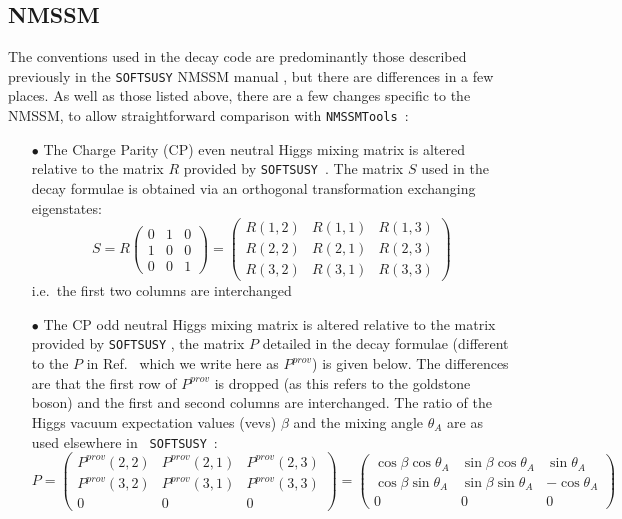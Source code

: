 \documentclass[final,3p,times]{elsarticle}
\begin{document}
\subsection{NMSSM} \label{NMSSMconventions}
The conventions used in the decay code are predominantly those described previously in the {\tt SOFTSUSY} NMSSM manual \cite{Allanach:2013kza}, but there are differences in a few places. As well as those listed above, there are a few changes specific to the NMSSM, to allow straightforward comparison with {\tt NMSSMTools}~\cite{Ellwanger:2004xm,Ellwanger:2006rn,Ellwanger:2012dd,Ellwanger:2006ch}:
\begin{itemize}
	\item[$\bullet$] The Charge Parity (CP) even neutral Higgs mixing matrix is altered relative to the matrix $R$ provided by {\tt SOFTSUSY}~\cite {Allanach:2013kza}. The matrix $S$ used in the decay formulae is obtained via an orthogonal transformation exchanging eigenstates:  
\begin{equation}
S = R \left( \begin{array}{ccc}
	0 & 1 & 0 \\
	1 & 0 & 0 \\
	0 & 0 & 1 \end{array} \right)
  =	\left( \begin{array}{ccc}
	R(1,2) & R(1,1) & R(1,3) \\
	R(2,2) & R(2,1) & R(2,3) \\
	R(3,2) & R(3,1) & R(3,3) \end{array} \right)
\end{equation}
i.e.\ the first two columns are interchanged 
	\item[$\bullet$] The CP odd neutral Higgs mixing matrix is altered
          relative to the matrix provided by {\tt SOFTSUSY}
          \cite{Allanach:2013kza}, the matrix $P$ detailed in the decay
          formulae (different to the $P$ in Ref.~\cite{Allanach:2013kza} which
          we write here as $P^{prov}$) is given below. The differences are
          that the           first 
          row of $P^{prov}$ is 
          dropped (as this refers to the goldstone boson) and the first and
          second columns are interchanged. The ratio of the Higgs vacuum
          expectation values (vevs) $\beta$ and the mixing angle $\theta_A$
          are as used elsewhere in {\tt
            SOFTSUSY}~\cite{Allanach:2001kg,Allanach:2013kza}: 
\begin{equation}
P = \left( \begin{array}{ccc}
	P^{prov}(2,2) & P^{prov}(2,1) & P^{prov}(2,3) \\
	P^{prov}(3,2) & P^{prov}(3,1) & P^{prov}(3,3) \\
	0 & 0 & 0 \end{array} \right)
	= \left( \begin{array}{ccc}
	\cos\beta\cos\theta_A & \sin\beta\cos\theta_A & \sin\theta_A \\
	\cos\beta\sin\theta_A & \sin\beta\sin\theta_A & -\cos\theta_A \\
	0 & 0 & 0 \end{array} \right)
\end{equation}

\end{itemize}
\end{document}
